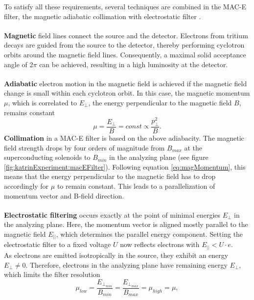 		To satisfy all these requirements, several techniques are combined in the MAC-E filter, the magnetic adiabatic collimation with electrostatic filter \cite{katrinPrinciple}.\\\\
		{\bf Magnetic} field lines connect the source and the detector. Electrons from tritium decays are guided from the source to the detector, thereby performing cyclotron orbits around the magnetic field lines. Consequently, a maximal solid acceptance angle of 2$\pi$ can be achieved, resulting in a high luminosity at the detector.\\\\
		{\bf Adiabatic} electron motion in the magnetic field is achieved if the magnetic field change is small within each cyclotron orbit. In this case, the magnetic momentum $\mu$, which is correlated to $E_\bot$, the energy perpendicular to the magnetic field $B$, remains constant
		\begin{equation}
			\mu = \frac{E_{\bot}}{B} = const \propto \frac{p^2_\bot}{B}.
			\label{eq:magMomentum}
		\end{equation}
		{\bf Collimation} in a MAC-E filter is based on the above adiabacity. The magnetic field strength drops by four orders of magnitude from $B_{max}$ at the superconducting solenoids to $B_{min}$ in the analyzing plane (see figure \ref{fig:katrinExperiment:macEFilter}). Following equation \ref{eq:magMomentum}, this means that the energy perpendicular to the magnetic field has to drop accordingly for $\mu$ to remain constant. This leads to a parallelization of momentum vector and B-field direction. \\\\
		{\bf Electrostatic filtering} occurs exactly at the point of minimal energies $E_\bot$ in the analyzing plane. Here, the momentum vector is aligned mostly parallel to the magnetic field $E_{||}$, which determines the parallel energy component. Setting the electrostatic filter to a fixed voltage $U$ now reflects electrons with $E_{||} < U\cdot e$.\\
		As electrons are emitted isotropically in the source, they exhibit an energy $E_\bot \neq 0$. Therefore, electrons in the analyzing plane have remaining energy $E_\bot$, which limits the filter resolution 
		\begin{equation}
			\mu_{low} = \frac{E_{\bot_{min}}}{B_{min}} = \frac{E_{\bot_{max}}}{B_{max}} = \mu_{high} = \mu,
		\end{equation}

